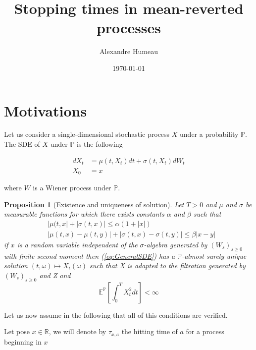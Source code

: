 \documentclass{article}
\newtheorem{proposition}[theorem]{Proposition}
\begin{document}
\title{Stopping times in mean-reverted processes}
\author{Alexandre Humeau}
\date{\today}
\maketitle

\section{Motivations}
Let us consider a single-dimensional stochastic process $X$ under a probability $\mathbb{P}$. The SDE of $X$ under $\mathbb{P}$ is the following 

\begin{equation}
	\label{eq:GeneralSDE}
	\begin{aligned}
		dX_t  &= \mu\left(t,X_t\right) dt + \sigma\left(t,X_t\right) dW_t\\
		X_0 &= x
	\end{aligned}
\end{equation}

\noindent where $W$ is a Wiener process under $\mathbb{P}$.

\begin{proposition}[Existence and uniqueness of solution]
	Let $T>0$ and $\mu$ and $\sigma$ be measurable functions for which there exists constants $\alpha$ and $\beta$ such that
	\begin{equation}
		\begin{aligned}
			&\left|\mu(t,x\right| + \left|\sigma(t,x)\right| \leq \alpha (1 + \left|x\right|)\\
			&\left|\mu(t,x) - \mu(t,y)\right| + \left|\sigma(t,x) - \sigma(t,y)\right| \leq \beta \left|x-y\right|
		\end{aligned}
	\end{equation}
	if $x$ is a random variable independent of the $\sigma$-algebra generated by $(W_s)_{s \geq 0}$ with finite second moment then (\ref{eq:GeneralSDE}) has a $\mathbb{P}$-almost surely unique solution $(t,\omega) \mapsto X_t(\omega)$ such that X is adapted to the filtration generated by $(W_s)_{s\geq 0}$ and Z and 
	\begin{equation}
		\mathbb{E}^{\mathbb{P}}\left[\int_0^T X_t^2 dt \right] < \infty
	\end{equation}
\end{proposition}

\noindent Let us now assume in the following that all of this conditions are verified.

\noindent Let pose $x \in \mathbb{R}$, we will denote by $\tau_{x,a}$ the hitting time of $a$ for a process beginning in $x$
\end{document}
